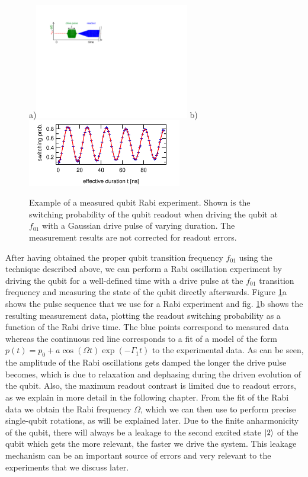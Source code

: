\begin{figure}[ht!]
\centering
a)\includegraphics[width=0.6\textwidth]{"./material/figures/measurement/qubit_rabi_oscillation"}
b)\includegraphics[width=0.6\textwidth]{"./data/ct5/2011_04_21 - grover and tomo/example - qubit 2 rabi"}
\caption[]{Example of a measured qubit Rabi experiment. Shown is the switching probability of the qubit readout when driving the qubit at $f_{01}$ with a Gaussian drive pulse of varying duration. The measurement results are not corrected for readout errors.}
\label{fig:qubit_rabi_example}
\end{figure}

After having obtained the proper qubit transition frequency $f_{01}$ using the technique described above, we can perform a Rabi oscillation experiment by driving the qubit for a well-defined time with a drive pulse at the $f_{01}$ transition frequency and measuring the state of the qubit directly afterwards. Figure \ref{fig:qubit_rabi_example}a shows the pulse sequence that we use for a Rabi experiment and fig. \ref{fig:qubit_rabi_example}b shows the resulting measurement data, plotting the readout switching probability as a function of the Rabi drive time. The blue points correspond to measured data whereas the continuous red line corresponds to a fit of a model of the form $p(t)=p_0+a\cos{(\Omega t)}\exp{(-\Gamma_1 t)}$ to the experimental data. As can be seen, the amplitude of the Rabi oscillations gets damped the longer the drive pulse becomes, which is due to relaxation and dephasing during the driven evolution of the qubit. Also, the maximum readout contrast is limited due to readout errors, as we explain in more detail in the following chapter. From the fit of the Rabi data we obtain the Rabi frequency $\Omega$, which we can then use to perform precise single-qubit rotations, as will be explained later. Due to the finite anharmonicity of the qubit, there will always be a leakage to the second excited state $\left| 2 \right>$ of the qubit which gets the more relevant, the faster we drive the system. This leakage mechanism can be an important source of errors and very relevant to the experiments that we discuss later.

